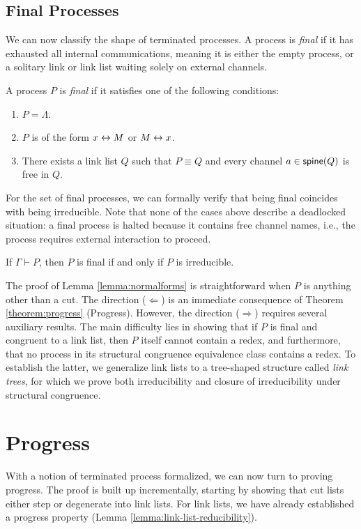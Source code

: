 \subsection{Final Processes}
We can now classify the shape of terminated processes. A process is \emph{final}
if it has exhausted all internal communications, meaning it is either the empty
process, or a solitary link or link list waiting solely on external channels.

\begin{definition} \label{def:final-process}
  A process $P$ is \emph{final} if it satisfies one of the following conditions:
  \begin{enumerate}[label=(\roman*)]
    \item $P = \Lambda$.
    \item $P$ is of the form $x \leftrightarrow M$ or $M \leftrightarrow x$.
    \item There exists a link list $Q$ such that $P \equiv Q$ and
          every channel $a \in \mathsf{spine}(Q)$ is free in $Q$.
  \end{enumerate}
\end{definition}

For the set of final processes, we can formally verify that being final coincides
with being irreducible. Note that none of the cases above describe a deadlocked
situation: a final process is halted because it contains free channel names, i.e.,
the process requires external interaction to proceed.

\begin{lemma} \label{lemma:normalforms}
  If $\Gamma \vdash P$, then $P$ is final if and only if
  $P$ is irreducible.
\end{lemma}

The proof of Lemma \ref{lemma:normalforms} is straightforward when $P$ is anything
other than a cut. The direction ($\Leftarrow$) is an immediate
consequence of Theorem \ref{theorem:progress} (Progress). However, the
direction ($\Rightarrow$) requires several auxiliary results. The main difficulty
lies in showing that if $P$ is final and congruent to a link list, then $P$
itself cannot contain a redex, and furthermore, that no process in its structural
congruence equivalence class contains a redex. To establish the latter, we
generalize link lists to a tree-shaped structure called \emph{link trees},
for which we prove both irreducibility and closure of irreducibility under
structural congruence.

\section{Progress}
With a notion of terminated process formalized, we can now turn to proving progress.
The proof is built up incrementally, starting by showing that cut lists either
step or degenerate into link lists. For link lists, we have already established
a progress property (Lemma \ref{lemma:link-list-reducibility}).

